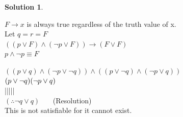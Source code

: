 \documentclass{article}
\theoremstyle{definition}
\newtheorem*{solution}{Solution}
\begin{document}
\begin{solution}
\begin{compactenum}
$F \to x $ is always true regardless of the truth value of x.\ \\
Let $q=r=F$\ \\
$((p \vee F ) \wedge (\neg p \vee F )) → (F \vee F )$\ \\
\therefore $p \wedge \neg p \equiv F$\ \\
\item $((p \vee q) \wedge (\neg p \vee \neg q)) \wedge ((p \vee \neg q) \wedge (\neg p \vee q))$\ \\
$(p \vee \neg q) \ \\(\neg p \vee q)$\ \\ 
|||||\ \\ 
$(\therefore \neg q \vee q)$ \ \ \ (Resolution)\ \\
This is not satisfiable for it cannot exist.\ \\

\end{compactenum}
\end{solution}
\end{document}

